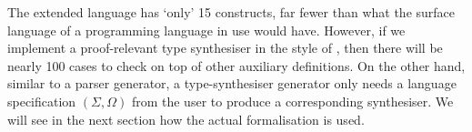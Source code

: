 \egroup

The extended language has `only' 15 constructs, far fewer than what the surface language of a programming language in use would have. 
However, if we implement a proof-relevant type synthesiser in the style of \citet{Wadler2022}, then there will be nearly 100 cases to check on top of other auxiliary definitions.
On the other hand, similar to a parser generator, a type-synthesiser generator only needs a language specification $(\Sigma, \Omega)$ from the user to produce a corresponding synthesiser. 
We will see in the next section how the actual formalisation is used.
